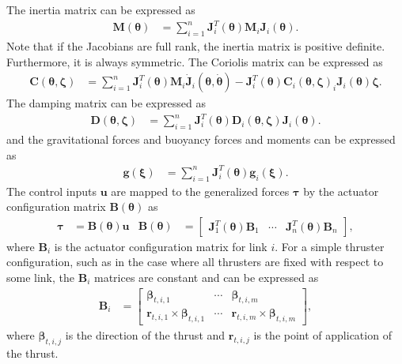 The inertia matrix
can be expressed as
\begin{align}
    \bm{M}(\bm{\theta}) &= \sum_{i=1}^{n} \bm{J}_{i}^T(\bm{\theta}) \bm{M}_i \bm{J}_{i}(\bm{\theta}).
\end{align}
Note that if the Jacobians are full rank, the inertia matrix is positive definite.
Furthermore, it is always symmetric. The Coriolis matrix can be expressed as
\begin{align}
    \bm{C}(\bm{\theta}, \bm{\zeta}) &=
    \sum_{i=1}^{n} \bm{J}_{i}^T(\bm{\theta}) \bm{M}_i \dot{\bm{J}}_{i}(\bm{\theta},\dot{\bm{\theta}})
    -\bm{J}_{i}^T(\bm{\theta}) \bm{C}_i(\bm{\theta},\bm{\zeta})_i \bm{J}_{i}(\bm{\theta}) \bm{\zeta}.
\end{align}
The damping matrix can be expressed as
\begin{align}
    \bm{D}(\bm{\theta}, \bm{\zeta}) &=
    \sum_{i=1}^{n} \bm{J}_{i}^T(\bm{\theta}) \bm{D}_i(\bm{\theta},\bm{\zeta}) \bm{J}_{i}(\bm{\theta}).
\end{align}
and the gravitational forces and buoyancy forces and moments can be expressed as
\begin{align}
    \bm{g}(\bm{\xi}) &=
    \sum_{i=1}^{n} \bm{J}_{i}^T(\bm{\theta}) \bm{g}_i(\bm{\xi}). \label{eq:modeling:g}
\end{align}
The control inputs $\bm{u}$ are mapped to the generalized forces $\bm{\tau}$ by
the actuator configuration matrix $\bm{B}(\bm{\theta})$ as
\begin{align}
    \bm{\tau} &= \bm{B}(\bm{\theta}) \bm{u} &
    \bm{B}(\bm{\theta}) &= \begin{bmatrix}
        \bm{J}_1^T(\bm{\theta}) \bm{B}_1 & \cdots & \bm{J}_n^T(\bm{\theta}) \bm{B}_n
    \end{bmatrix},
\end{align}
where $\bm{B}_i$ is the actuator configuration matrix for link $i$. For a simple
thruster configuration, such as in the case where all thrusters are fixed with
respect to some link, the $\bm{B}_i$ matrices are constant and can be expressed
as
\begin{align}
    \bm{B}_i &= \begin{bmatrix}
        \bm{\beta}_{t,i,1} & \cdots & \bm{\beta}_{t,i,m} \\
        \bm{r}_{t,i,1} \times \bm{\beta}_{t,i,1} & \cdots & \bm{r}_{t,i,m} \times \bm{\beta}_{t,i,m}
    \end{bmatrix},
\end{align}
where $\bm{\beta}_{t,i,j}$ is the direction of the thrust and $\bm{r}_{t,i,j}$
is the point of application of the thrust.





